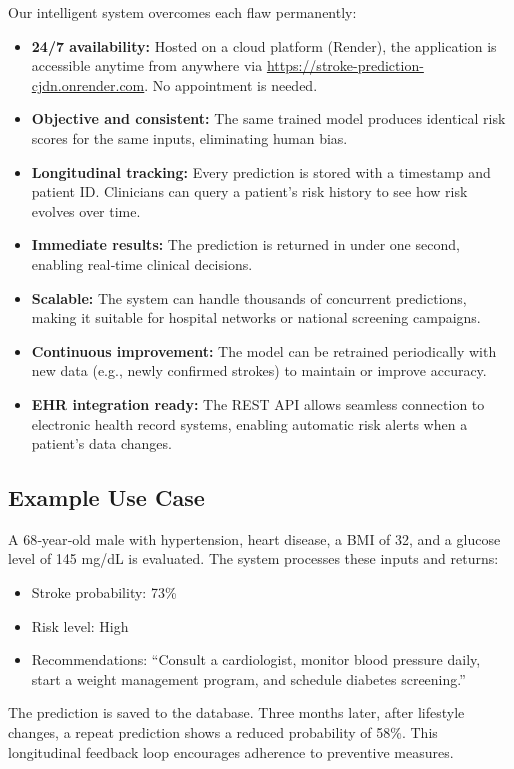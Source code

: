 \documentclass[12pt,a4paper]{article}
\begin{document}
Our intelligent system overcomes each flaw permanently:

\begin{itemize}
    \item \textbf{24/7 availability:} Hosted on a cloud platform (Render), the application is accessible anytime from anywhere via \url{https://stroke-prediction-cjdn.onrender.com}. No appointment is needed.
    \item \textbf{Objective and consistent:} The same trained model produces identical risk scores for the same inputs, eliminating human bias.
    \item \textbf{Longitudinal tracking:} Every prediction is stored with a timestamp and patient ID. Clinicians can query a patient’s risk history to see how risk evolves over time.
    \item \textbf{Immediate results:} The prediction is returned in under one second, enabling real‑time clinical decisions.
    \item \textbf{Scalable:} The system can handle thousands of concurrent predictions, making it suitable for hospital networks or national screening campaigns.
    \item \textbf{Continuous improvement:} The model can be retrained periodically with new data (e.g., newly confirmed strokes) to maintain or improve accuracy.
    \item \textbf{EHR integration ready:} The REST API allows seamless connection to electronic health record systems, enabling automatic risk alerts when a patient’s data changes.
\end{itemize}

\subsection{Example Use Case}
A 68‑year‑old male with hypertension, heart disease, a BMI of 32, and a glucose level of 145 mg/dL is evaluated. The system processes these inputs and returns:
\begin{itemize}
    \item Stroke probability: 73\%
    \item Risk level: High
    \item Recommendations: “Consult a cardiologist, monitor blood pressure daily, start a weight management program, and schedule diabetes screening.”
\end{itemize}
The prediction is saved to the database. Three months later, after lifestyle changes, a repeat prediction shows a reduced probability of 58\%. This longitudinal feedback loop encourages adherence to preventive measures.
\end{document}
